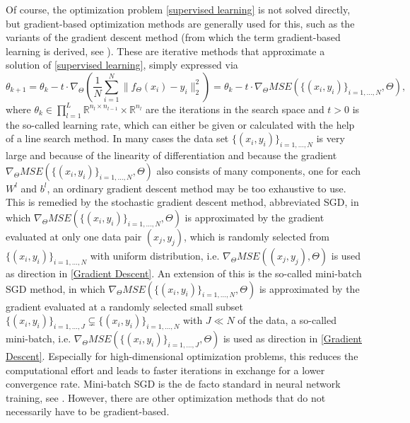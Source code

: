Of course, the optimization problem \cref{supervised learning} is not solved directly, but gradient-based optimization methods are generally used for this, such as the variants of the gradient descent method (from which the term gradient-based learning is derived, see \cite[p.~177]{GoodfellowBengioCourville:2016}). These are iterative methods that approximate a solution of \cref{supervised learning}, simply expressed via 
\begin{equation}
    \label{Gradient Descent}
    \theta_{k+1} = \theta_k - t \cdot \nabla_{\Theta} \left( \frac{1}{N}\sum_{i=1}^{N} \lVert f_{\Theta} \left(x_{i}\right) - y_{i}\rVert^{2}_2 \right) = \theta_k - t \cdot \nabla_{\Theta} MSE(\{ (x_i, y_i) \}_{i = 1, \ldots, N}, \Theta),
\end{equation}
where $\theta_k \in \prod^L_{l=1}  \mathbb{R}^{n_l \times n_{l-1}} \times \mathbb{R}^{n_l}$ are the iterations in the search space and $t > 0$ is the so-called learning rate, which can either be given or calculated with the help of a line search method. In many cases the data set $\{ (x_i, y_i) \}_{i = 1, \ldots, N}$ is very large and because of the linearity of differentiation and because the gradient $\nabla_{\Theta} MSE(\{ (x_i, y_i) \}_{i = 1, \ldots, N}, \Theta)$ also consists of many components, one for each $W^l$ and $b^l$, an ordinary gradient descent method may be too exhaustive to use. This is remedied by the stochastic gradient descent method, abbreviated SGD, in which $\nabla_{\Theta} MSE(\{ (x_i, y_i) \}_{i = 1, \ldots, N}, \Theta)$ is approximated by the gradient evaluated at only one data pair $(x_j, y_j)$, which is randomly selected from $\{ (x_i, y_i) \}_{i = 1, \ldots, N}$ with uniform distribution, i.e. $\nabla_{\Theta} MSE((x_j, y_j), \Theta)$ is used as direction in \cref{Gradient Descent}. An extension of this is the so-called mini-batch SGD method, in which $\nabla_{\Theta} MSE(\{ (x_i, y_i) \}_{i = 1, \ldots, N}, \Theta)$ is approximated by the gradient evaluated at a randomly selected small subset $\{ (x_i, y_i) \}_{i = 1, \ldots, J} \subsetneq  \{ (x_i, y_i) \}_{i = 1, \ldots, N}$ with $J \ll N$ of the data, a so-called mini-batch, i.e. $\nabla_{\Theta} MSE(\{ (x_i, y_i) \}_{i = 1, \ldots, J}, \Theta)$ is used as direction in \cref{Gradient Descent}. Especially for high-dimensional optimization problems, this reduces the computational effort and leads to faster iterations in exchange for a lower convergence rate. Mini-batch SGD is the de facto standard in neural network training, see \cite[sections~5.9~+~8.3.1]{GoodfellowBengioCourville:2016}. However, there are other optimization methods that do not necessarily have to be gradient-based. \\
